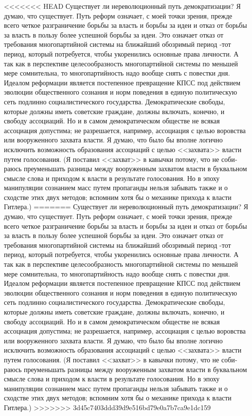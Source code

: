 \documentclass{book}
\begin{document}
<<<<<<< HEAD
Существует ли нереволюционный путь демократизации? Я думаю, что существует. Путь реформ означает, с моей точки зрения, прежде всего четкое разграничение борьбы за власть и борьбы за идеи и отказ от борьбы за власть в пользу более успешной борьбы за идеи. Это означает отказ от требования многопартийной системы на ближайший обозримый период ‑тот период, который потребуется, чтобы укоренились основные права личности. А так как в перспективе целесообразность многопартийной системы по меньшей мере сомнительна, то мно­гопартийность надо вообще снять с повестки дня. Идеалом ре­формации является постепенное превращение КПСС под дей­ствием эволюции общественного сознания и норм поведения в единую политическую сеть подлинно социалистического госу­дарства. Демократические свободы, которые должны иметь советские граждане, должны включать, конечно, и свободу ассоциаций. Но и в самом демократическом обществе не вся­кая ассоциация допустима; не разрешается, например, ассо­циация с целью воровства или вооруженного захвата власти. Я думаю, что было бы вполне логично исключить возможность образования ассоциаций с целью <<захвата>> власти путем голо­сования. (Я поставил <<захват>> в кавычки потому, что не соби­раюсь преуменьшать разницы между вооруженным захватом власти в буквальном смысле слова и приходом к власти в ре­зультате голосования. Но в эпоху манипуляции сознанием масс путем пропаганды нельзя забывать также и о сходстве этих двух методов; вспомним хотя бы о механике прихода к власти Гитлера.)
=======
Существует ли нереволюционный путь демократизации? Я думаю, что существует. Путь реформ означает, с моей точки зрения, прежде всего четкое разграничение борьбы за власть и борьбы за идеи и отказ от борьбы за власть в пользу более успешной борьбы за идеи. Это означает отказ от требования многопартийной системы на ближайший обозримый период -тот период, который потребуется, чтобы укоренились основные права личности. А так как в перспективе целесообразность многопартийной системы по меньшей мере сомнительна, то мно­гопартийность надо вообще снять с повестки дня. Идеалом ре­формации является постепенное превращение КПСС под дей­ствием эволюции общественного сознания и норм поведения в единую политическую сеть подлинно социалистического госу­дарства. Демократические свободы, которые должны иметь советские граждане, должны включать, конечно, и свободу ассоциаций. Но и в самом демократическом обществе не вся­кая ассоциация допустима; не разрешается, например, ассо­циация с целью воровства или вооруженного захвата 
власти. Я думаю, что было бы вполне логично исключить возможность образования ассоциаций с целью <<захвата>> власти путем голо­сования. (Я поставил <<захват>> в кавычки потому, что не соби­раюсь преуменьшать разницы между вооруженным захватом власти в буквальном смысле слова и приходом к власти в ре­зультате голосования. Но в эпоху манипуляции сознанием масс путем пропаганды нельзя забывать также и о сходстве этих двух методов; вспомним хотя бы о механике прихода к власти Гитлера.)
>>>>>>> 3d45c7403ddd39d9e516bd79e0a7b7ca9e1dc159
\end{document}
